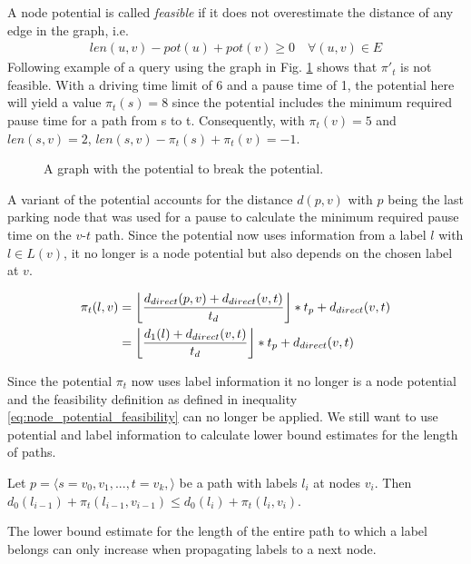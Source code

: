 A node potential is called \emph{feasible} if it does not overestimate the distance of any edge in the graph, i.e.
\begin{align}
	\label{eq:node_potential_feasibility}
	len(u,v) - pot(u) + pot(v) \ge 0 \quad \forall (u,v) \in E
\end{align}
Following example of a query using the graph in Fig. \ref{fig:graph_infeasible_potential} shows that $\pi{'}_t$ is not feasible. With a driving time limit of 6 and a pause time of 1, the potential here will yield a value $\pi_t(s) = 8$ since the potential includes the minimum required pause time for a path from s to t. Consequently, with $\pi_t(v) = 5$ and $len(s,v) = 2$, $len(s,v) - \pi_t(s) + \pi_t(v) = -1$.

\begin{figure}[hbtp]
	\centering
	
	\caption{A graph with the potential to break the potential.}
	\label{fig:graph_infeasible_potential}
\end{figure}

A variant of the potential accounts for the distance $d(p,v)$ with $p$ being the last parking node that was used for a pause to calculate the minimum required pause time on the $v$-$t$ path. Since the potential now uses information from a label $l$ with $l \in L(v)$, it no longer is a node potential but also depends on the chosen label at $v$.

\begin{align*}
	\pi_t(l,v) & = \floor*{ \frac{d_{direct}(p,v) + d_{direct}(v,t)}{t_d} } * t_p + d_{direct}(v,t) \\
	           & = \floor*{ \frac{d_1(l) + d_{direct}(v,t)}{t_d} } * t_p + d_{direct}(v,t)
\end{align*}

Since the potential $\pi_t$ now uses label information it no longer is a node potential and the feasibility definition as defined in inequality \ref{eq:node_potential_feasibility} can no longer be applied. We still want to use potential and label information to calculate lower bound estimates for the length of paths.

\begin{lemma}\label{lemma:pot_labels_get_larger}
	Let $p = \langle s=v_0,v_1,...,t=v_k, \rangle$ be a path with labels $l_i$ at nodes $v_i$. Then $d_0(l_{i-1}) + \pi_t(l_{i-1},v_{i-1}) \le d_0(l_i) + \pi_t(l_i,v_i)$.
\end{lemma}

The lower bound estimate for the length of the entire path to which a label belongs can only increase when propagating labels to a next node.

